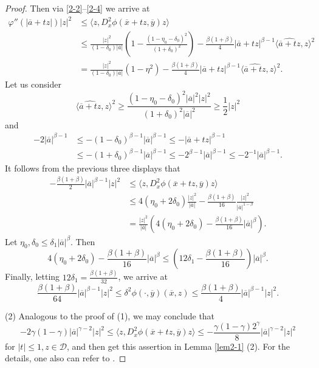 \documentclass[11pt,reqno]{amsart}
\numberwithin{equation}{section}
\begin{document}
\begin{proof}
Then via \eqref{2-2}--\eqref{2-4} we arrive at
\begin{align*}
\varphi''(|\overline{a}+tz|)|z|^2&\le \langle z,D^2_x\phi(\overline{x}+tz,\overline{y})z\rangle\\
&\le\frac{|z|^2}{(1-\delta_0)|\overline{a}|}\left(1-\frac{(1-\eta_0-\delta_0)^2}{(1+\delta_0)^2}\right)-\frac{\beta(1+\beta)}{4}|\overline{a}+tz|^{\beta-1}
\langle\widehat{\overline{a}+tz},z\rangle^2\\
&=\frac{|z|^2}{(1-\delta_0)|\overline{a}|}(1-\eta^2)-\frac{\beta(1+\beta)}{4}|\overline{a}+tz|^{\beta-1}
\langle\widehat{\overline{a}+tz},z\rangle^2.
\end{align*}
Let us consider
$$
\langle\widehat{\overline{a}+tz},z\rangle^2\ge\frac{(1-\eta_0-\delta_0)^2|\overline{a}|^2|z|^2}{(1+\delta_0)^2|\overline{a}|^2}\ge\frac{1}{2}|z|^2
$$
and
\begin{align*}
-2|\overline{a}|^{\beta-1}
&\le-(1-\delta_0)^{\beta-1}|\overline{a}|^{\beta-1}\le-|\overline{a}+tz|^{\beta-1}\\
&\le-(1+\delta_0)^{\beta-1}|\overline{a}|^{\beta-1}\le-2^{\beta-1}|\overline{a}|^{\beta-1}\le-2^{-1}|\overline{a}|^{\beta-1}.
\end{align*}
It follows from the previous three displays that
\begin{align*}
-\frac{\beta(1+\beta)}{2}|\overline{a}|^{\beta-1}|z|^2&\le\langle z,D^2_x\phi(\overline{x}+tz,\overline{y})z\rangle\\
&\le4(\eta_0+2\delta_0)\frac{|z|^2}{|\overline{a}|}-\frac{\beta(1+\beta)}{16}\frac{|z|^2}{|\overline{a}|^{1-\beta}}\\
&=\frac{|z|^2}{|\overline{a}|}\left(4(\eta_0+2\delta_0)-\frac{\beta(1+\beta)}{16}|\overline{a}|^{\beta}\right).
\end{align*}
Let $\eta_0,\delta_0\le\delta_1|\overline{a}|^{\beta}$. Then
$$
4(\eta_0+2\delta_0)-\frac{\beta(1+\beta)}{16}|\overline{a}|^{\beta}\le\left(12\delta_1-\frac{\beta(1+\beta)}{16}\right)|\overline{a}|^{\beta}.
$$
Finally, letting $12\delta_1=\frac{\beta(1+\beta)}{32}$, we arrive at
$$
\frac{\beta(1+\beta)}{64}|\overline{a}|^{\beta-1}|z|^2\le\delta^2\phi(\cdot,\overline{y})(\overline{x},z)\le\frac{\beta(1+\beta)}{4}|\overline{a}|^{\beta-1}|z|^2.
$$

(2) Analogous to the proof of (1), we may conclude that
$$
-2\gamma(1-\gamma)|\overline{a}|^{\gamma-2}|z|^2\le\langle z,D^2_x\phi(\overline{x}+tz,\overline{y})z\rangle\le-\frac{\gamma(1-\gamma)2^\gamma}{8}|\overline{a}|^{\gamma-2}|z|^2
$$
for $|t|\le1, z\in\mathcal{D}$, and then get this assertion in Lemma \ref{lem2-1} (2). For the details, one also can refer to \cite[Lemma 2.2 (i)]{BT25}.
\end{proof}
\end{document}

